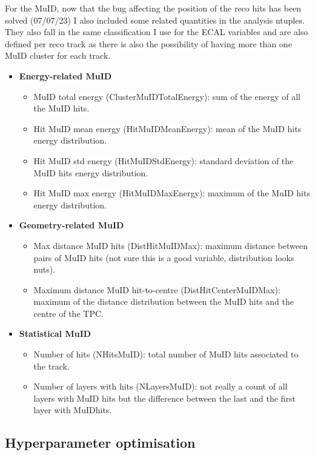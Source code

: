 For the MuID, now that the bug affecting the position of the reco hits has been solved (07/07/23) I also included some related quantities in the analysis ntuples. They also fall in the same classification I use for the ECAL variables and are also defined per reco track as there is also the possibility of having more than one MuID cluster for each track.

\begin{itemize}
	\item \textbf{Energy-related MuID}
	\begin{itemize}
		\item MuID total energy (ClusterMuIDTotalEnergy): sum of the energy of all the MuID hits.
		\item Hit MuID mean energy (HitMuIDMeanEnergy): mean of the MuID hits energy distribution.
		\item Hit MuID std energy (HitMuIDStdEnergy): standard deviation of the MuID hits energy distribution.
		\item Hit MuID max energy (HitMuIDMaxEnergy): maximum of the MuID hits energy distribution.
	\end{itemize}
	\item \textbf{Geometry-related MuID}
	\begin{itemize}
		\item Max distance MuID hits (DistHitMuIDMax): maximum distance between pairs of MuID hits (not sure this is a good variable, distribution looks nuts).
		\item Maximum distance MuID hit-to-centre (DistHitCenterMuIDMax): maximum of the distance distribution between the MuID hits and the centre of the TPC.
	\end{itemize}
	\item \textbf{Statistical MuID}
	\begin{itemize}
		\item Number of hits (NHitsMuID): total number of MuID hits associated to the track.
		\item Number of layers with hits (NLayersMuID): not really a count of all layers with MuID hits but the difference between the last and the first layer with MuIDhits.
	\end{itemize}
\end{itemize}

\subsection{Hyperparameter optimisation}

